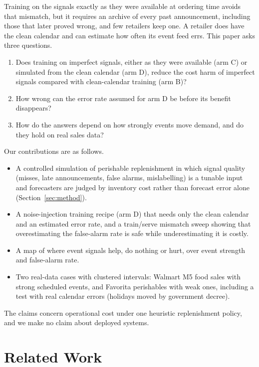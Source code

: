 Training on the signals exactly as they were available at ordering time avoids that mismatch, but it requires an archive of every past announcement, including those that later proved wrong, and few retailers keep one. A retailer does have the clean calendar and can estimate how often its event feed errs. This paper asks three questions.
\begin{enumerate}
    \item Does training on imperfect signals, either as they were available (arm C) or simulated from the clean calendar (arm D), reduce the cost harm of imperfect signals compared with clean-calendar training (arm B)?
    \item How wrong can the error rate assumed for arm D be before its benefit disappears?
    \item How do the answers depend on how strongly events move demand, and do they hold on real sales data?
\end{enumerate}
Our contributions are as follows.
\begin{itemize}
    \item A controlled simulation of perishable replenishment in which signal quality (misses, late announcements, false alarms, mislabelling) is a tunable input and forecasters are judged by inventory cost rather than forecast error alone (Section~\ref{sec:method}).
    \item A noise-injection training recipe (arm D) that needs only the clean calendar and an estimated error rate, and a train/serve mismatch sweep showing that overestimating the false-alarm rate is safe while underestimating it is costly.
    \item A map of where event signals help, do nothing or hurt, over event strength and false-alarm rate.
    \item Two real-data cases with clustered intervals: Walmart M5 food sales with strong scheduled events, and Favorita perishables with weak ones, including a test with real calendar errors (holidays moved by government decree).
\end{itemize}
The claims concern operational cost under one heuristic replenishment policy, and we make no claim about deployed systems.

\section{Related Work}
\label{sec:related}

